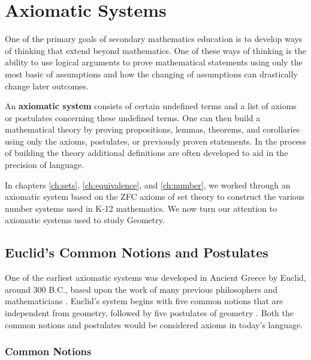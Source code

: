 \documentclass[
]{book}
\theoremstyle{definition}
\theoremstyle{definition}
\theoremstyle{definition}
\theoremstyle{definition}
\theoremstyle{remark}
\begin{document}
\hypertarget{axiomatic-systems}{%
\section{Axiomatic Systems}\label{axiomatic-systems}}

One of the primary goals of secondary mathematics education is to develop ways of thinking that extend beyond mathematics. One of these ways of thinking is the ability to use logical arguments to prove mathematical statements using only the most basic of assumptions and how the changing of assumptions can drastically change later outcomes.

An \textbf{axiomatic system} consists of certain undefined terms and a list of axioms or postulates concerning these undefined terms. One can then build a mathematical theory by proving propositions, lemmas, theorems, and corollaries using only the axioms, postulates, or previously proven statements. In the process of building the theory additional definitions are often developed to aid in the precision of language.

In chapters \ref{ch:sets}, \ref{ch:equivalence}, and \ref{ch:number}, we worked through an axiomatic system based on the ZFC axioms of set theory to construct the various number systems used in K-12 mathematics. We now turn our attention to axiomatic systems used to study Geometry.

\hypertarget{euclids-common-notions-and-postulates}{%
\subsection{Euclid's Common Notions and Postulates}\label{euclids-common-notions-and-postulates}}

One of the earliest axiomatic systems was developed in Ancient Greece by Euclid, around 300 B.C., based upon the work of many previous philosophers and mathematicians \citep{Heath1908_1}. Euclid's system begins with five common notions that are independent from geometry, followed by five postulates of geometry \citep[p.~154-155]{Heath1908_1}. Both the common notions and postulates would be considered axioms in today's language.

\hypertarget{common-notions}{%
\subsubsection*{Common Notions}\label{common-notions}}
\end{document}
